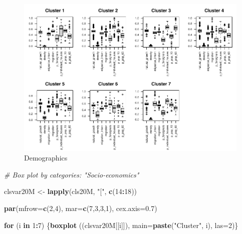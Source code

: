 \documentclass[
]{book}
\newenvironment{Shaded}{\begin{snugshade}}{\end{snugshade}}
\newcommand{\AttributeTok}[1]{\textcolor[rgb]{0.13,0.29,0.53}{#1}}
\newcommand{\CommentTok}[1]{\textcolor[rgb]{0.56,0.35,0.01}{\textit{#1}}}
\newcommand{\ControlFlowTok}[1]{\textcolor[rgb]{0.13,0.29,0.53}{\textbf{#1}}}
\newcommand{\DecValTok}[1]{\textcolor[rgb]{0.00,0.00,0.81}{#1}}
\newcommand{\FloatTok}[1]{\textcolor[rgb]{0.00,0.00,0.81}{#1}}
\newcommand{\FunctionTok}[1]{\textcolor[rgb]{0.13,0.29,0.53}{\textbf{#1}}}
\newcommand{\NormalTok}[1]{#1}
\newcommand{\OtherTok}[1]{\textcolor[rgb]{0.56,0.35,0.01}{#1}}
\newcommand{\SpecialCharTok}[1]{\textcolor[rgb]{0.81,0.36,0.00}{\textbf{#1}}}
\newcommand{\StringTok}[1]{\textcolor[rgb]{0.31,0.60,0.02}{#1}}
\begin{document}
\begin{figure}
\centering
\includegraphics{05-SOM_files/figure-latex/boxplot-clsM-Deographic-1.pdf}
\caption{\label{fig:boxplot-clsM-Deographic}Demographics}
\end{figure}

\begin{Shaded}
\begin{Highlighting}[]
\CommentTok{\# Box plot by categories: "Socio{-}economics"}

\NormalTok{clsvar20M }\OtherTok{\textless{}{-}} \FunctionTok{lapply}\NormalTok{(cls20M, }\StringTok{"["}\NormalTok{, }\FunctionTok{c}\NormalTok{(}\DecValTok{14}\SpecialCharTok{:}\DecValTok{18}\NormalTok{)) }

\FunctionTok{par}\NormalTok{(}\AttributeTok{mfrow=}\FunctionTok{c}\NormalTok{(}\DecValTok{2}\NormalTok{,}\DecValTok{4}\NormalTok{), }\AttributeTok{mar=}\FunctionTok{c}\NormalTok{(}\DecValTok{7}\NormalTok{,}\DecValTok{3}\NormalTok{,}\DecValTok{3}\NormalTok{,}\DecValTok{1}\NormalTok{), }\AttributeTok{cex.axis=}\FloatTok{0.7}\NormalTok{)}

\ControlFlowTok{for}\NormalTok{ (i }\ControlFlowTok{in} \DecValTok{1}\SpecialCharTok{:}\DecValTok{7}\NormalTok{) \{}\FunctionTok{boxplot}\NormalTok{ ((clsvar20M[[i]]), }\AttributeTok{main=}\FunctionTok{paste}\NormalTok{(}\StringTok{"Cluster"}\NormalTok{, i),  }\AttributeTok{las=}\DecValTok{2}\NormalTok{)\}}
\end{Highlighting}
\end{Shaded}
\end{document}
